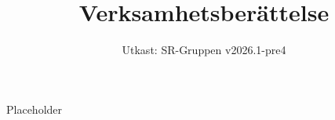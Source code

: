 \documentclass[a4paper]{dtek}
\title{Verksamhetsberättelse}
\date{Utkast: SR-Gruppen v2026.1-pre4}
\begin{document}
Placeholder
\end{document}
